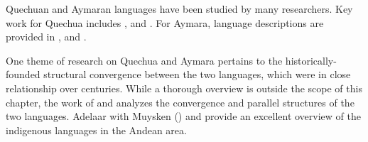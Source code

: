 \documentclass[output=paper,hidelinks]{langscibook}
\begin{document}






Quechuan and Aymaran languages have been studied by many researchers. Key work for Quechua includes 
\citet{adelaar2004, albo1970, cerron1987, RN61, mannheim1991, taylor2006}, and \citet{urton1997social}. 
For Aymara, language descriptions are provided in \citet{briggs1976dialectal, cerron2000origen, coler2014grammar, hardman1973aymara}, and \citet{hardman2001aymara}. 

One theme of research on Quechua and Aymara pertains to the historically-founded structural convergence between the two languages, which were in close relationship over centuries. While a thorough overview is outside the scope of this chapter, the work of \citet{adelaar2012modeling} and \citet{cerron2008quechumara} analyzes the convergence and parallel structures of the two languages. Adelaar with Muysken (\citeyear{adelaar2004}) and \citet{crevels2009lenguas} provide an excellent overview of the indigenous languages in the Andean area. 
\end{document}
